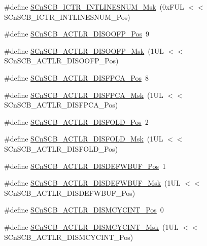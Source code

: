 \begin{DoxyCompactItemize}
\#define \hyperlink{group___c_m_s_i_s___s_cn_s_c_b_ga3efa0f5210051464e1034b19fc7b33c7}{S\-Cn\-S\-C\-B\-\_\-\-I\-C\-T\-R\-\_\-\-I\-N\-T\-L\-I\-N\-E\-S\-N\-U\-M\-\_\-\-Msk}~(0x\-F\-U\-L $<$$<$ S\-Cn\-S\-C\-B\-\_\-\-I\-C\-T\-R\-\_\-\-I\-N\-T\-L\-I\-N\-E\-S\-N\-U\-M\-\_\-\-Pos)
\item 
\#define \hyperlink{group___c_m_s_i_s___s_cn_s_c_b_gaff0b57464c60fea8182b903676f8de49}{S\-Cn\-S\-C\-B\-\_\-\-A\-C\-T\-L\-R\-\_\-\-D\-I\-S\-O\-O\-F\-P\-\_\-\-Pos}~9
\item 
\#define \hyperlink{group___c_m_s_i_s___s_cn_s_c_b_ga1ecd6adafa43464d7097b132c19e8640}{S\-Cn\-S\-C\-B\-\_\-\-A\-C\-T\-L\-R\-\_\-\-D\-I\-S\-O\-O\-F\-P\-\_\-\-Msk}~(1\-U\-L $<$$<$ S\-Cn\-S\-C\-B\-\_\-\-A\-C\-T\-L\-R\-\_\-\-D\-I\-S\-O\-O\-F\-P\-\_\-\-Pos)
\item 
\#define \hyperlink{group___c_m_s_i_s___s_cn_s_c_b_gaa194809383bc72ecf3416d85709281d7}{S\-Cn\-S\-C\-B\-\_\-\-A\-C\-T\-L\-R\-\_\-\-D\-I\-S\-F\-P\-C\-A\-\_\-\-Pos}~8
\item 
\#define \hyperlink{group___c_m_s_i_s___s_cn_s_c_b_ga10d5aa4a196dcde6f476016ece2c1b69}{S\-Cn\-S\-C\-B\-\_\-\-A\-C\-T\-L\-R\-\_\-\-D\-I\-S\-F\-P\-C\-A\-\_\-\-Msk}~(1\-U\-L $<$$<$ S\-Cn\-S\-C\-B\-\_\-\-A\-C\-T\-L\-R\-\_\-\-D\-I\-S\-F\-P\-C\-A\-\_\-\-Pos)
\item 
\#define \hyperlink{group___c_m_s_i_s___s_cn_s_c_b_gaab395870643a0bee78906bb15ca5bd02}{S\-Cn\-S\-C\-B\-\_\-\-A\-C\-T\-L\-R\-\_\-\-D\-I\-S\-F\-O\-L\-D\-\_\-\-Pos}~2
\item 
\#define \hyperlink{group___c_m_s_i_s___s_cn_s_c_b_gaa9dd2d4a2350499188f438d0aa9fd982}{S\-Cn\-S\-C\-B\-\_\-\-A\-C\-T\-L\-R\-\_\-\-D\-I\-S\-F\-O\-L\-D\-\_\-\-Msk}~(1\-U\-L $<$$<$ S\-Cn\-S\-C\-B\-\_\-\-A\-C\-T\-L\-R\-\_\-\-D\-I\-S\-F\-O\-L\-D\-\_\-\-Pos)
\item 
\#define \hyperlink{group___c_m_s_i_s___s_cn_s_c_b_gafa2eb37493c0f8dae77cde81ecf80f77}{S\-Cn\-S\-C\-B\-\_\-\-A\-C\-T\-L\-R\-\_\-\-D\-I\-S\-D\-E\-F\-W\-B\-U\-F\-\_\-\-Pos}~1
\item 
\#define \hyperlink{group___c_m_s_i_s___s_cn_s_c_b_ga6cda7b7219232a008ec52cc8e89d5d08}{S\-Cn\-S\-C\-B\-\_\-\-A\-C\-T\-L\-R\-\_\-\-D\-I\-S\-D\-E\-F\-W\-B\-U\-F\-\_\-\-Msk}~(1\-U\-L $<$$<$ S\-Cn\-S\-C\-B\-\_\-\-A\-C\-T\-L\-R\-\_\-\-D\-I\-S\-D\-E\-F\-W\-B\-U\-F\-\_\-\-Pos)
\item 
\#define \hyperlink{group___c_m_s_i_s___s_cn_s_c_b_gaaa3e79f5ead4a32c0ea742b2a9ffc0cd}{S\-Cn\-S\-C\-B\-\_\-\-A\-C\-T\-L\-R\-\_\-\-D\-I\-S\-M\-C\-Y\-C\-I\-N\-T\-\_\-\-Pos}~0
\item 
\#define \hyperlink{group___c_m_s_i_s___s_cn_s_c_b_ga2a2818f0489ad10b6ea2964e899d4cbc}{S\-Cn\-S\-C\-B\-\_\-\-A\-C\-T\-L\-R\-\_\-\-D\-I\-S\-M\-C\-Y\-C\-I\-N\-T\-\_\-\-Msk}~(1\-U\-L $<$$<$ S\-Cn\-S\-C\-B\-\_\-\-A\-C\-T\-L\-R\-\_\-\-D\-I\-S\-M\-C\-Y\-C\-I\-N\-T\-\_\-\-Pos)
\end{DoxyCompactItemize}


